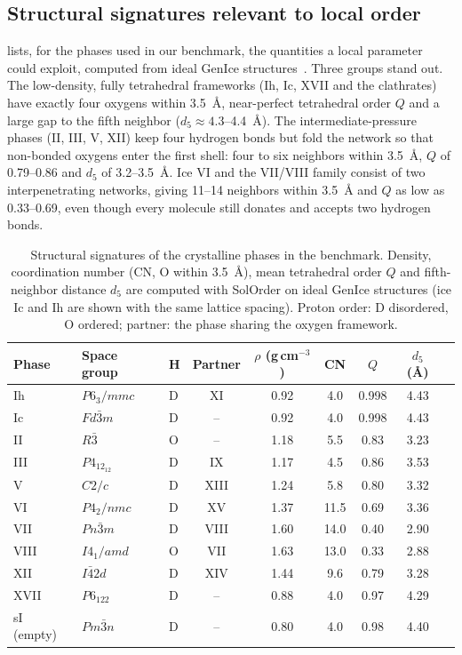 \documentclass[11pt,a4paper]{article}
\begin{document}
\subsection{Structural signatures relevant to local order}
 lists, for the phases used in our benchmark, the
quantities a local parameter could exploit, computed from ideal GenIce
structures~\cite{Matsumoto2018,Matsumoto2024}. Three groups stand out. The
low-density, fully tetrahedral frameworks (Ih, Ic, XVII and the clathrates)
have exactly four oxygens within 3.5~\AA{}, near-perfect tetrahedral order $Q$
and a large gap to the fifth neighbor ($d_5\approx4.3$--4.4~\AA). The
intermediate-pressure phases (II, III, V, XII) keep four hydrogen bonds but
fold the network so that non-bonded oxygens enter the first shell: four to six
neighbors within 3.5~\AA, $Q$ of 0.79--0.86 and $d_5$ of 3.2--3.5~\AA. Ice VI
and the VII/VIII family consist of two interpenetrating networks, giving
11--14 neighbors within 3.5~\AA{} and $Q$ as low as 0.33--0.69, even though
every molecule still donates and accepts two hydrogen bonds.

\begin{table}[H]
\centering
\small
\caption{Structural signatures of the crystalline phases in the benchmark.
Density, coordination number (CN, O within 3.5~\AA), mean tetrahedral order
$Q$ and fifth-neighbor distance $d_5$ are computed with SolOrder on ideal
GenIce structures (ice Ic and Ih are shown with the same lattice spacing).
Proton order: D disordered, O ordered; partner: the phase sharing the oxygen
framework.}
\label{tab:phases}
\begin{tabular}{lllcccccc}
\toprule
Phase & Space group & H & Partner & $\rho$ (g\,cm$^{-3}$) & CN & $Q$ & $d_5$ (\AA) \\
\midrule
Ih   & $P6_3/mmc$   & D & XI   & 0.92 & 4.0  & 0.998 & 4.43 \\
Ic   & $Fd\bar3m$   & D & --   & 0.92 & 4.0  & 0.998 & 4.43 \\
II   & $R\bar3$     & O & --   & 1.18 & 5.5  & 0.83  & 3.23 \\
III  & $P4_12_12$   & D & IX   & 1.17 & 4.5  & 0.86  & 3.53 \\
V    & $C2/c$       & D & XIII & 1.24 & 5.8  & 0.80  & 3.32 \\
VI   & $P4_2/nmc$   & D & XV   & 1.37 & 11.5 & 0.69  & 3.36 \\
VII  & $Pn\bar3m$   & D & VIII & 1.60 & 14.0 & 0.40  & 2.90 \\
VIII & $I4_1/amd$   & O & VII  & 1.63 & 13.0 & 0.33  & 2.88 \\
XII  & $I\bar42d$   & D & XIV  & 1.44 & 9.6  & 0.79  & 3.28 \\
XVII & $P6_122$     & D & --   & 0.88 & 4.0  & 0.97  & 4.29 \\
sI (empty) & $Pm\bar3n$ & D & -- & 0.80 & 4.0 & 0.98 & 4.40 \\
\bottomrule
\end{tabular}
\end{table}
\end{document}
